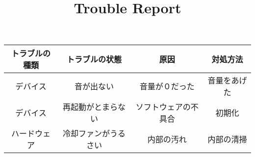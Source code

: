 \documentclass[a4paper]{jarticle}
\title{Trouble Report}
\begin{document}
\begin{center}
\begin{table}
  \begin{tabular}{|c||c|c|c|}
    \hline
    トラブルの種類 & トラブルの状態 & 原因 & 対処方法\\
    \hline
    \hline
    デバイス & 音が出ない & 音量が０だった & 音量をあげた\\
    \hline
    デバイス & 再起動がとまらない & ソフトウェアの不具合 & 初期化\\
    \hline
    ハードウェア & 冷却ファンがうるさい & 内部の汚れ & 内部の清掃\\
    \hline
  \end{tabular}
  \end{table}
\end{center}
\end{document}
